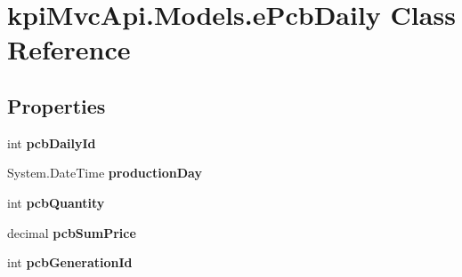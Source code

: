 \hypertarget{classkpi_mvc_api_1_1_models_1_1e_pcb_daily}{}\section{kpi\+Mvc\+Api.\+Models.\+e\+Pcb\+Daily Class Reference}
\label{classkpi_mvc_api_1_1_models_1_1e_pcb_daily}
\subsection*{Properties}
\begin{DoxyCompactItemize}
\item 
\mbox{\label{classkpi_mvc_api_1_1_models_1_1e_pcb_daily_a0d973956e9000971d6921111c01a8557}} 
int {\bfseries pcb\+Daily\+Id}
\item 
\mbox{\label{classkpi_mvc_api_1_1_models_1_1e_pcb_daily_aab56ba85c50fe8351f694fdaa7b072b0}} 
System.\+Date\+Time {\bfseries production\+Day}
\item 
\mbox{\label{classkpi_mvc_api_1_1_models_1_1e_pcb_daily_a218c5a5c5b2213d668c32a2e0f5100d9}} 
int {\bfseries pcb\+Quantity}
\item 
\mbox{\label{classkpi_mvc_api_1_1_models_1_1e_pcb_daily_a6b2a7b1ac2e55ff257d0c6e5e4aeb2de}} 
decimal {\bfseries pcb\+Sum\+Price}
\item 
\mbox{\label{classkpi_mvc_api_1_1_models_1_1e_pcb_daily_ab8567796817f3c632da74bcd87d86fd2}} 
int {\bfseries pcb\+Generation\+Id}
\item 
\mbox{\label{classkpi_mvc_api_1_1_models_1_1e_pcb_daily_a3ea44196ce6fa0a140bdab7e389729ac}} 

\end{DoxyCompactItemize}
